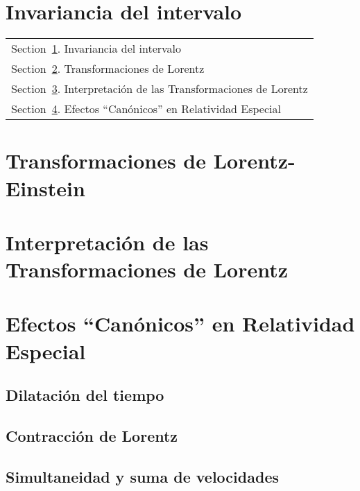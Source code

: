 \documentclass[../main]{subfiles}
\begin{document}
\section{Invariancia del intervalo}\label{sec:InvIntervalo}
	\begin{margintable}\vspace{1.4in}\footnotesize
		\begin{tabularx}{\marginparwidth}{|X}
		Section~\ref{sec:InvIntervalo}. Invariancia del intervalo\\
        Section~\ref{sec:TransLorentz}. Transformaciones de Lorentz\\
        Section~\ref{Sec:IntLorentz}. Interpretación de las Transformaciones de Lorentz\\
        Section~\ref{Sec:EfectosCanonicos}. Efectos ``Canónicos'' en Relatividad Especial\\
		\end{tabularx}
    \end{margintable}
	\lipsum[1]
 
	\section{Transformaciones de Lorentz-Einstein} \label{sec:TransLorentz}
        \begin{fullpage}
            \lipsum[1]
        \end{fullpage}

	\section{Interpretación de las Transformaciones de Lorentz}\label{Sec:IntLorentz}
	\begin{fullpage}
	       \lipsum[1]
	\end{fullpage}
	

	\section{Efectos ``Canónicos'' en Relatividad Especial}\label{Sec:EfectosCanonicos}
        \begin{fullpage}
            \lipsum[1]
        \end{fullpage}	

        \subsection{Dilatación del tiempo}
        \begin{fullpage}
            \lipsum[1]
        \end{fullpage}

        \subsection{Contracción de Lorentz}
        \begin{fullpage}
            \lipsum[1]
        \end{fullpage}

        \subsection{Simultaneidad y suma de velocidades}
        \begin{fullpage}
            \lipsum[1]
        \end{fullpage}
\end{document}
